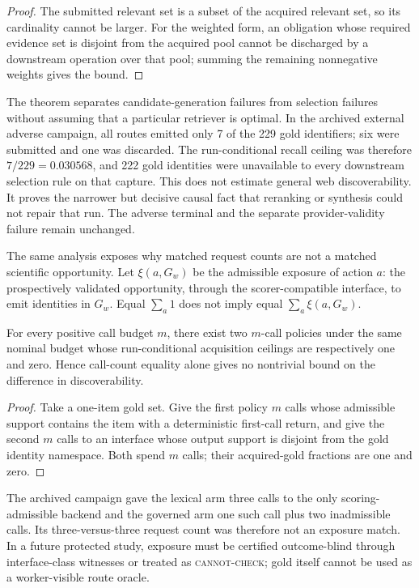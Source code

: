 \begin{proof}
The submitted relevant set is a subset of the acquired relevant set, so its
cardinality cannot be larger.  For the weighted form, an obligation whose
required evidence set is disjoint from the acquired pool cannot be discharged
by a downstream operation over that pool; summing the remaining nonnegative
weights gives the bound.
\end{proof}

The theorem separates candidate-generation failures from selection failures
without assuming that a particular retriever is optimal.  In the archived
external adverse campaign, all routes emitted only 7 of the 229 gold
identifiers; six were submitted and one was discarded.  The run-conditional
recall ceiling was therefore $7/229=0.030568$, and 222 gold identities were
unavailable to every downstream selection rule on that capture.  This does not
estimate general web discoverability.  It proves the narrower but decisive
causal fact that reranking or synthesis could not repair that run.  The adverse
terminal and the separate provider-validity failure remain unchanged.

The same analysis exposes why matched request counts are not a matched
scientific opportunity.  Let $\xi(a,G_w)$ be the admissible exposure of action
$a$: the prospectively validated opportunity, through the scorer-compatible
interface, to emit identities in $G_w$.  Equal $\sum_a 1$ does not imply equal
$\sum_a\xi(a,G_w)$.

\begin{proposition}
\label{prop:call-exposure}
For every positive call budget $m$, there exist two $m$-call policies under the
same nominal budget whose run-conditional acquisition ceilings are respectively
one and zero.  Hence call-count equality alone gives no nontrivial bound on the
difference in discoverability.
\end{proposition}

\begin{proof}
Take a one-item gold set.  Give the first policy $m$ calls whose admissible
support contains the item with a deterministic first-call return, and give the
second $m$ calls to an interface whose output support is disjoint from the gold
identity namespace.  Both spend $m$ calls; their acquired-gold fractions are one
and zero.
\end{proof}

The archived campaign gave the lexical arm three calls to
the only scoring-admissible backend and the governed arm one such call plus two
inadmissible calls.  Its three-versus-three request count was therefore not an
exposure match.  In a future protected study, exposure must be certified
outcome-blind through interface-class witnesses or treated as
\textsc{cannot-check}; gold itself cannot be used as a worker-visible route
oracle.

